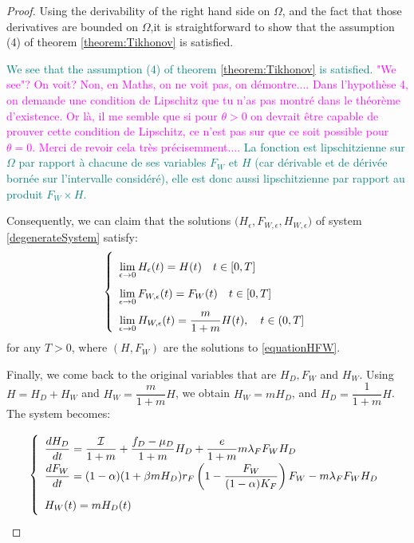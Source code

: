 \documentclass{article}
\newcommand{\lfw}{\lambda_{F}}
\newcommand{\lfw}{\lambda_{F}}
\newcommand{\cI}{\mathcal{I}}
\newcommand{\marc}[1]{\textcolor{teal}{#1}}
\newcommand{\YD}[1]{\textcolor{magenta}{#1}}
\begin{document}
\begin{proof}
Using the derivability of the right hand side on $\Omega$, and the fact that those derivatives are bounded on $\Omega$,it is straightforward to show that the assumption (4) of theorem \ref{theorem:Tikhonov} is satisfied.

\marc{We see that the assumption (4) of theorem \ref{theorem:Tikhonov} is satisfied.} \YD{"We see"? On voit? Non, en Maths, on ne voit pas, on démontre.... Dans l'hypothèse 4, on demande une condition de Lipschitz que tu n'as pas montré dans le théorème d'existence. Or là, il me semble que si pour $\theta>0$ on devrait être capable de prouver cette condition de Lipschitz, ce n'est pas sur que ce soit possible pour $\theta=0$. Merci de revoir cela très précisemment.... }
\marc{La fonction est lipschitzienne sur $\Omega$ par rapport à chacune de ses variables $F_W$ et $H$ (car dérivable et de dérivée bornée sur l'intervalle considéré), elle est donc aussi lipschitzienne par rapport au produit $F_W \times H$.} 

Consequently, we can claim that the solutions 
$\Big(H_{ \epsilon}, F_{W,  \epsilon}, H_{W,  \epsilon} \Big)$  of system \eqref{degenerateSystem} satisfy:
\begin{equation*}
\def\arraystretch{2}
\left\lbrace \begin{array}{l}
\lim\limits_{ \epsilon \rightarrow 0}{H_{ \epsilon}(t)} = H(t) \quad t \in [0,T] \\
\lim\limits_{ \epsilon \rightarrow 0} F_{W,  \epsilon}(t) = F_W(t)\quad t \in [0,T] \\
 \lim\limits_{ \epsilon \rightarrow 0} H_{W,  \epsilon}(t) = \dfrac{m}{1+m}H(t), \quad  t\in (0,T] \\
\end{array} \right.
\end{equation*}
for any $T > 0$, where $(H, F_W)$ are the solutions to \eqref{equationHFW}. 

\medskip
Finally, we come back to the original variables that are $H_D, F_W$ and $H_W$. Using $H = H_D + H_W$ and $H_W = \dfrac{m}{1+m}H$, we obtain $H_W = m H_D$, and $H_D = \dfrac{1}{1+m}	H$. The system becomes:

\begin{equation*}
\def\arraystretch{2}
\left\lbrace \begin{array}{l}
\dfrac{dH_D}{dt} = \dfrac{\cI}{1+m} + \dfrac{f_D - \mu_D}{1+m} H_D + \dfrac{e}{1+m} m \lfw F_W H_D \\
\dfrac{dF_W}{dt} = (1-\alpha) (1+\beta m H_D) r_F \left(1 - \dfrac{F_W}{(1-\alpha)K_F} \right) F_W - m \lfw F_WH_D \\
H_W(t) = m H_D(t)
\end{array} \right.
\end{equation*}

\end{proof}
\end{document}
